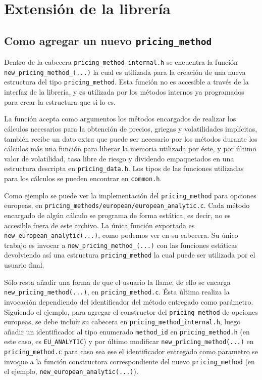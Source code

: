\documentclass[12pt,a4paper,final]{article}
\begin{document}
\section{Extensión de la librería}
	\subsection{Como agregar un nuevo \texttt{pricing\_method}}
		Dentro de la cabecera \texttt{pricing\_method\_internal.h} se encuentra 
		la función \texttt{new\_pricing\_method\_(...)} la cual es utilizada
		para la creación de una nueva estructura del tipo \texttt{pricing\_method}.
		Esta función no es accesible a través de la interfaz de la librería, y es utilizada 
		por los métodos internos ya programados para crear la estructura que si lo es.
		
		La función acepta como argumentos los métodos encargados de realizar los cálculos
		necesarios para la obtención de precios, griegas y volatilidades implícitas, también recibe un dato
		extra que puede ser necesario por los métodos durante los cálculos más una función para liberar
		la memoria utilizada por éste, y por último valor de volatilidad, tasa libre de riesgo y dividendo
		empaquetados en una estructura descripta en \texttt{pricing\_data.h}. Los tipos de las funciones
		utilizadas para los cálculos se pueden encontrar en \texttt{common.h}.
				
		Como ejemplo se puede ver la implementación del \texttt{pricing\_method} para opciones europeas,
		en \texttt{pricing\_methods/european/european\_analytic.c}. Cada método encargado de algún cálculo
		se programa de forma estática, es decir, no es accesible fuera de este archivo. La única
		función exportada es \texttt{new\_european\_analytic(...)}, como podemos ver en su cabecera.
		Su único trabajo es invocar a \texttt{new\_pricing\_method\_(...)} con las funciones estáticas
		devolviendo así una estructura \texttt{pricing\_method} la cual puede ser utilizada por el usuario final.
		
		Sólo resta añadir una forma de que el usuario la llame, de ello se encarga \texttt{new\_pricing\_method(...)},
		en \texttt{pricing\_method.c}. Ésta última realiza la invocación dependiendo del identificador del método
		entregado como parámetro. Siguiendo el ejemplo, para agregar el constructor del \texttt{pricing\_method} de
		opciones europeas, se debe incluír su cabecera en \texttt{pricing\_method\_internal.h}, luego
		añadir un identificador al tipo enumerado \texttt{method\_id} en \texttt{pricing\_method.h} (en este caso,
		es \texttt{EU\_ANALYTIC}) y por último modificar \texttt{new\_pricing\_method(...)} 
		en \texttt{pricing\_method.c} para caso sea ese el identificador entregado como parametro se invoque a
		la función constructora correspondiente del nuevo \texttt{pricing\_method} (en el ejemplo, 
		\texttt{new\_european\_analytic(...)}). 
		
\end{document}
